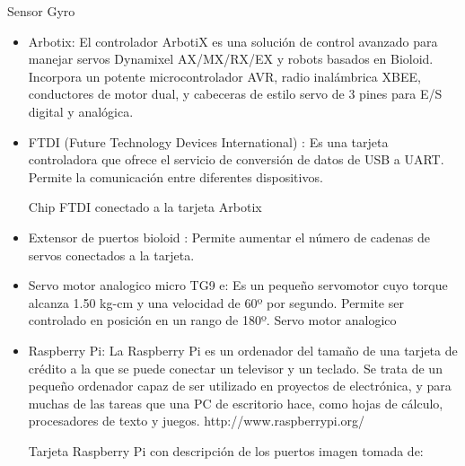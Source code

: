 Sensor Gyro 
\begin{itemize}
\item Arbotix: El controlador ArbotiX es una solución de control avanzado para manejar servos Dynamixel AX/MX/RX/EX y robots basados en Bioloid. Incorpora un potente microcontrolador AVR, radio inalámbrica XBEE, conductores de motor dual, y cabeceras de estilo servo de 3 pines para E/S digital y analógica.

\end{itemize}
\begin{itemize}
\item FTDI (Future Technology Devices International) : Es una tarjeta controladora que ofrece el servicio de conversión de datos de USB a UART. Permite la comunicación entre diferentes dispositivos. 

Chip FTDI conectado a la tarjeta Arbotix

\end{itemize}


\begin{itemize}
\item Extensor de puertos bioloid : Permite aumentar el número de cadenas de servos conectados a la tarjeta. 


\end{itemize}


\begin{itemize}
\item Servo motor analogico micro TG9 e: Es un pequeño servomotor cuyo torque alcanza 1.50 kg-cm y una velocidad de 60º por segundo. Permite ser controlado en posición en un rango de 180º. 
Servo motor analogico 

\end{itemize}

\begin{itemize}
\item Raspberry Pi: La Raspberry Pi es un ordenador del tamaño de una tarjeta de crédito a la que se puede conectar un televisor y un teclado. Se trata de un pequeño ordenador capaz de ser utilizado en proyectos de electrónica, y para muchas de las tareas que una PC de escritorio hace, como hojas de cálculo, procesadores de texto y juegos. http://www.raspberrypi.org/ 


Tarjeta Raspberry Pi con descripción de los puertos
imagen tomada de: %

\end{itemize}

